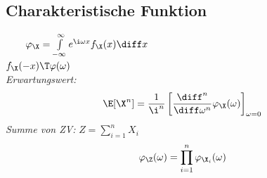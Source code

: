 \documentclass[german,color,6pt]{latex4ei/latex4ei_sheet}
\begin{document}
%
%
%
%
%
%

\begin{sectionbox}
	\subsection{Charakteristische Funktion} %
	\label{sub:charakteristische_funktion}
	 $\qquad \varphi_{\X} = \int\limits_{-\infty}^\infty e^{\i\omega x} f_{\X}(x) \diff x$\\
	$f_{\X}(-x) \T \varphi(\omega)$ \\

	\emph{Erwartungswert:}
	\begin{eqnarray*}
		\E[\X^n] = \frac{1}{\i^n} \left[\frac{\diff^n}{\diff \omega^n} \varphi_{\X}(\omega)\right]_{\omega = 0}
	\end{eqnarray*}
	\emph{Summe von ZV:} $Z=\sum_{i=1}^{n}X_i$
	\begin{eqnarray*}
		\varphi_{\Z} (\omega) = \prod_{i=1}^{n} \varphi_{\X_i} (\omega)
	\end{eqnarray*}
\end{sectionbox}
\end{document}
